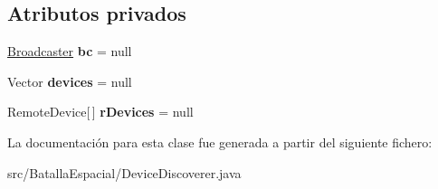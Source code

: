 \subsection*{Atributos privados}
\begin{DoxyCompactItemize}
\item 
\hypertarget{classBatallaEspacial_1_1DeviceDiscoverer_a9c832f493c6888299954d96e20cc01fb}{
\hyperlink{classBatallaEspacial_1_1Broadcaster}{Broadcaster} {\bfseries bc} = null}
\label{classBatallaEspacial_1_1DeviceDiscoverer_a9c832f493c6888299954d96e20cc01fb}

\item 
\hypertarget{classBatallaEspacial_1_1DeviceDiscoverer_a6d836b8d4274faaff4b0d16188c2c60f}{
Vector {\bfseries devices} = null}
\label{classBatallaEspacial_1_1DeviceDiscoverer_a6d836b8d4274faaff4b0d16188c2c60f}

\item 
\hypertarget{classBatallaEspacial_1_1DeviceDiscoverer_a8409783740775a312b7d457c6b05408a}{
RemoteDevice\mbox{[}$\,$\mbox{]} {\bfseries rDevices} = null}
\label{classBatallaEspacial_1_1DeviceDiscoverer_a8409783740775a312b7d457c6b05408a}

\end{DoxyCompactItemize}


La documentación para esta clase fue generada a partir del siguiente fichero:\begin{DoxyCompactItemize}
\item 
src/BatallaEspacial/DeviceDiscoverer.java\end{DoxyCompactItemize}
